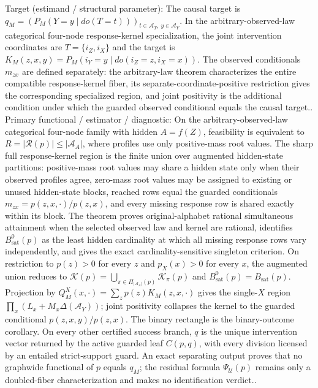 \documentclass{article}
\begin{document}
Target (estimand / structural parameter): The causal target is \(q_M=(P_M(Y=y\mid do(T=t)))_{t\in\mathcal A_T,\ y\in\mathcal A_Y}\).  In the arbitrary-observed-law categorical four-node response-kernel specialization, the joint intervention coordinates are \(T=\{i_Z,i_X\}\) and the target is \(K_M(z,x,y)=P_M(i_Y=y\mid do(i_Z=z,i_X=x))\).  The observed conditionals \(m_{zx}\) are defined separately: the arbitrary-law theorem characterizes the entire compatible response-kernel fiber, its separate-coordinate-positive restriction gives the corresponding specialized region, and joint positivity is the additional condition under which the guarded observed conditional equals the causal target..
Primary functional / estimator / diagnostic: On the arbitrary-observed-law categorical four-node family with hidden \(A=f(Z)\), feasibility is equivalent to \(R=|\mathcal R(p)|\leq|\mathcal A_A|\), where profiles use only positive-mass root values.  The sharp full response-kernel region is the finite union over augmented hidden-state partitions: positive-mass root values may share a hidden state only when their observed profiles agree, zero-mass root values may be assigned to existing or unused hidden-state blocks, reached rows equal the guarded conditionals \(m_{zx}=p(z,x,\cdot)/p(z,x)\), and every missing response row is shared exactly within its block.  The theorem proves original-alphabet rational simultaneous attainment when the selected observed law and kernel are rational, identifies \(B_{\mathrm{sat}}^{0}(p)\) as the least hidden cardinality at which all missing response rows vary independently, and gives the exact cardinality-sensitive singleton criterion.  On restriction to \(p(z)>0\) for every \(z\) and \(p_X(x)>0\) for every \(x\), the augmented union reduces to \(\mathcal K(p)=\bigcup_{\pi\in\Pi_{|\mathcal A_A|}(p)}\mathcal K_\pi(p)\) and \(B_{\mathrm{sat}}^{0}(p)=B_{\mathrm{sat}}(p)\).  Projection by \(Q_M^X(x,\cdot)=\sum_zp(z)K_M(z,x,\cdot)\) gives the single-\(X\) region \(\prod_x(L_x+M_x\Delta(\mathcal A_Y))\); joint positivity collapses the kernel to the guarded conditional \(p(z,x,y)/p(z,x)\).  The binary rectangle is the binary-outcome corollary.  On every other certified success branch, \(q\) is the unique intervention vector returned by the active guarded leaf \(C(p,q)\), with every division licensed by an entailed strict-support guard.  An exact separating output proves that no graphwide functional of \(p\) equals \(q_M\); the residual formula \(\Psi_{\mathcal U}(p)\) remains only a doubled-fiber characterization and makes no identification verdict..
\end{document}
